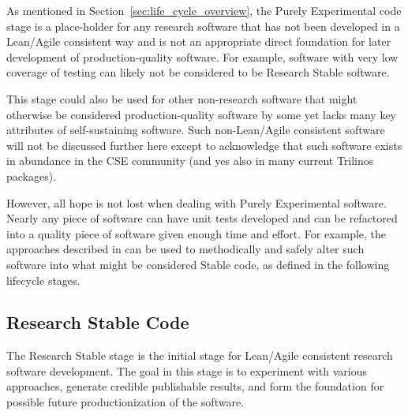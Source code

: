 \documentclass[11pt]{SANDreport}
\begin{document}
As mentioned in Section~\ref{sec:life_cycle_overview}, the Purely
Experimental code stage is a place-holder for any research software
that has not been developed in a Lean/Agile consistent way and is not
an appropriate direct foundation for later development of
production-quality software.  For example, software with very low
coverage of testing can likely not be considered to be Research Stable
software.

This stage could also be used for other non-research software that
might otherwise be considered production-quality software by some yet
lacks many key attributes of self-sustaining software.  Such
non-Lean/Agile consistent software will not be discussed further here
except to acknowledge that such software exists in abundance in the CSE
community (and yes also in many current Trilinos packages).

However, all hope is not lost when dealing with Purely Experimental
software.  Nearly any piece of software can have unit tests developed
and can be refactored into a quality piece of software given enough
time and effort.  For example, the approaches described in
{}\cite{WorkingEffectivelyWithLegacyCode05} can be used to
methodically and safely alter such software into what might be
considered Stable code, as defined in the following lifecycle stages.


%
{}\subsection{Research Stable Code}
\label{sec:research_stable_code}
%

The Research Stable stage is the initial stage for Lean/Agile
consistent research software development.  The goal in this stage is
to experiment with various approaches, generate credible publishable
results, and form the foundation for possible future productionization
of the software.
\end{document}
